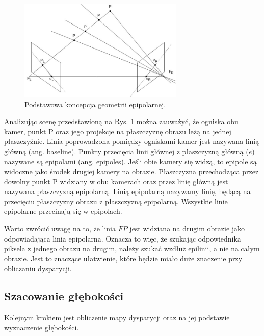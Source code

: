 \documentclass[oneside, eng]{mgr}
\begin{document}
\begin{figure}
\centering
	\includegraphics[width=0.70\textwidth]{epipolar.jpg}\par\vspace{1cm}
\caption{Podstawowa koncepcja geometrii epipolarnej.}
	\label{fig:epipolar_scene}
\end{figure}

Analizując scenę przedstawioną na Rys. \ref{fig:epipolar_scene} można zauważyć, że ogniska obu kamer, punkt P oraz jego projekcje na płaszczyznę obrazu leżą na jednej płaszczyźnie. Linia poprowadzona pomiędzy ogniskami kamer jest nazywana linią główną (ang. baseline). 
Punkty przecięcia linii głównej z płaszczyzną główną ($e$) nazywane są epipolami (ang. epipoles). Jeśli obie kamery się widzą, to epipole są widoczne jako środek drugiej kamery na obrazie.
Płaszczyzna przechodząca przez dowolny punkt P widziany w obu kamerach oraz przez linię główną jest nazywana płaszczyzną epipolarną.
Linią epipolarną nazywamy linię, będącą na przecięciu płaszczyzny obrazu z płaszczyzną epipolarną. Wszystkie linie epipolarne przecinają się w epipolach.

Warto zwrócić uwagę na to, że linia $F P$ jest widziana na drugim obrazie jako odpowiadająca linia epipolarna. Oznacza to więc, że szukając odpowiednika piksela z jednego obrazu na drugim, należy szukać wzdłuż epilinii, a nie na całym obrazie. Jest to znaczące ułatwienie, które będzie miało duże znaczenie przy obliczaniu dysparycji.

\subsection{Szacowanie głębokości}

Kolejnym krokiem jest obliczenie mapy dysparycji oraz na jej podstawie wyznaczenie głębokości. 
\end{document}
